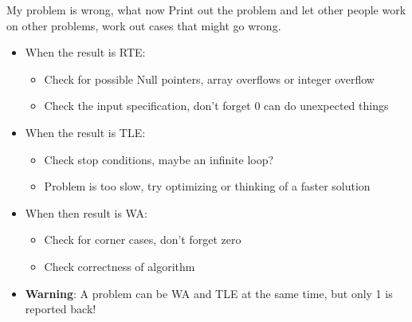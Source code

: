\documentclass[11pt,pdf, aspectratio=169]{beamer}
\begin{document}
  \begin{frame}{My problem is wrong, what now}
    Print out the problem and let other people work on other problems, work out cases that might go wrong.
    \begin{itemize}
      \item When the result is RTE:
      \begin{itemize}
        \item Check for possible Null pointers, array overflows or integer overflow
        \item Check the input specification, don't forget 0 can do unexpected things
      \end{itemize}
      \item When the result is TLE:
      \begin{itemize}
        \item Check stop conditions, maybe an infinite loop?
        \item Problem is too slow, try optimizing or thinking of a faster solution
      \end{itemize}
      \item When then result is WA:
      \begin{itemize}
        \item Check for corner cases, don't forget zero
        \item Check correctness of algorithm
      \end{itemize}
      \item \textbf{Warning}: A problem can be WA and TLE at the same time, but only 1 is reported back!
    \end{itemize}
  \end{frame}
\end{document}
